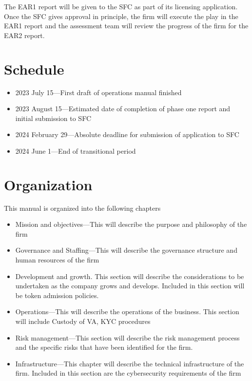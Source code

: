 The EAR1 report will be given to the SFC as part of its licensing
application.  Once the SFC gives approval in principle, the firm will
execute the play in the EAR1 report and the assessment team will
review the progress of the firm for the EAR2 report.

\section{Schedule}
\begin{itemize}
\item 2023 July 15—First draft of operations manual finished
  \item 2023 August 15—Estimated date of completion of phase one
    report and initial submission to SFC
    \item 2024 February 29—Absolute deadline for submission of
      application to SFC
    \item 2024 June 1—End of transitional period
\end{itemize}


\section{Organization}

This manual is organized into the following chapters

\begin{itemize}
\item Mission and objectives—This will describe the purpose and
  philosophy of the firm
  \item Governance and Staffing—This will describe the governance
    structure and human resources of the firm
  \item Development and growth.  This section will describe the
    considerations to be undertaken as the company grows and develops.
    Included in this section will be token admission policies.
  \item Operations—This will describe the operations of the
    business.  This section will include Custody of VA, KYC procedures
  \item Risk management—This section will describe the risk
    management process and the specific risks that have been
    identified for the firm.
  \item Infrastructure—This chapter will describe the technical
    infrastructure of the firm.  Included in this section are the
    cybersecurity requirements of the firm
\end{itemize}

